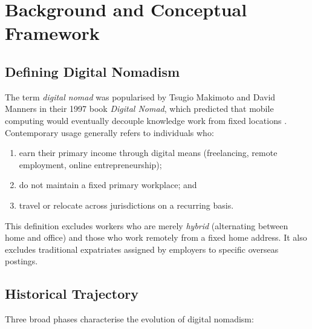 \documentclass[12pt,a4paper]{article}
\begin{document}
\section{Background and Conceptual Framework}
\label{sec:background}

\subsection{Defining Digital Nomadism}

The term \emph{digital nomad} was popularised by Tsugio Makimoto and David
Manners in their 1997 book \emph{Digital Nomad}, which predicted that mobile
computing would eventually decouple knowledge work from fixed locations
\citep{MakimotoManners1997}. Contemporary usage generally refers to individuals
who:

\begin{enumerate}[label=(\roman*)]
  \item earn their primary income through digital means (freelancing, remote
        employment, online entrepreneurship);
  \item do not maintain a fixed primary workplace; and
  \item travel or relocate across jurisdictions on a recurring basis.
\end{enumerate}

This definition excludes workers who are merely \emph{hybrid} (alternating
between home and office) and those who work remotely from a fixed home address.
It also excludes traditional expatriates assigned by employers to specific
overseas postings.

\subsection{Historical Trajectory}

Three broad phases characterise the evolution of digital nomadism:
\end{document}
